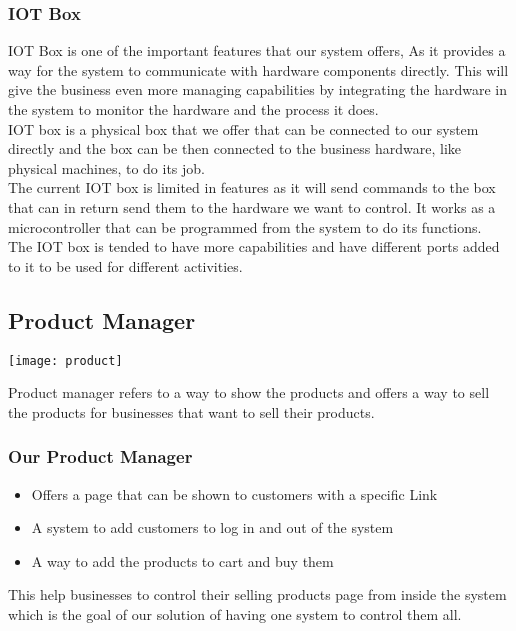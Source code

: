 \subsubsection{IOT Box}
IOT Box is one of the important features that our system offers, As it provides a way for the system to
communicate with hardware components directly. This will give the business even more managing
capabilities by integrating the hardware in the system to monitor the hardware and the process it does.\\
IOT box is a physical box that we offer that can be connected to our system directly and the box can
be then connected to the business hardware, like physical machines, to do its job.\\
The current IOT box is limited in features as it will send commands to the box that can in return send
them to the hardware we want to control. It works as a microcontroller that can be programmed from
the system to do its functions.\\
The IOT box is tended to have more capabilities and have different ports added to it to be used for
different activities.


\break
\subsection{Product Manager}

\begin{center}
    \texttt{[image: product]}
\end{center}

Product manager refers to a way to show the products and offers a way to sell the products for businesses that want to sell their products.
\subsubsection{Our Product Manager}
\begin{itemize}
    \item Offers a page that can be shown to customers with a specific Link
    \item A system to add customers to log in and out of the system
    \item A way to add the products to cart and buy them
\end{itemize}
This help businesses to control their selling products page from inside the system which is the goal of our solution of having one system to control them all.\\\\


